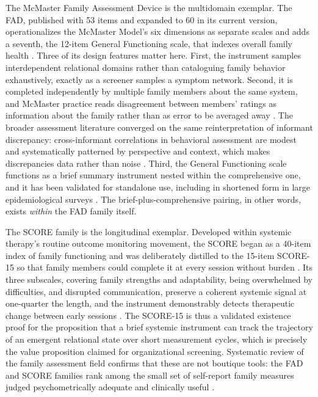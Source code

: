\documentclass[12pt, letterpaper]{article}
\begin{document}
The McMaster Family Assessment Device is the multidomain exemplar. The FAD, published with 53 items and expanded to 60 in its current version, operationalizes the McMaster Model's six dimensions as separate scales and adds a seventh, the 12-item General Functioning scale, that indexes overall family health \parencite{epstein1983,miller2000}. Three of its design features matter here. First, the instrument samples interdependent relational domains rather than cataloguing family behavior exhaustively, exactly as a screener samples a symptom network. Second, it is completed independently by multiple family members about the same system, and McMaster practice reads disagreement between members' ratings as information about the family rather than as error to be averaged away \parencite{miller2000}. The broader assessment literature converged on the same reinterpretation of informant discrepancy: cross-informant correlations in behavioral assessment are modest and systematically patterned by perspective and context, which makes discrepancies data rather than noise \parencite{achenbach1987,delosreyes2005}. Third, the General Functioning scale functions as a brief summary instrument nested within the comprehensive one, and it has been validated for standalone use, including in shortened form in large epidemiological surveys \parencite{boterhovendehaan2015}. The brief-plus-comprehensive pairing, in other words, exists \emph{within} the FAD family itself.

The SCORE family is the longitudinal exemplar. Developed within systemic therapy's routine outcome monitoring movement, the SCORE began as a 40-item index of family functioning and was deliberately distilled to the 15-item SCORE-15 so that family members could complete it at every session without burden \parencite{stratton2010}. Its three subscales, covering family strengths and adaptability, being overwhelmed by difficulties, and disrupted communication, preserve a coherent systemic signal at one-quarter the length, and the instrument demonstrably detects therapeutic change between early sessions \parencite{stratton2014}. The SCORE-15 is thus a validated existence proof for the proposition that a brief systemic instrument can track the trajectory of an emergent relational state over short measurement cycles, which is precisely the value proposition claimed for organizational screening. Systematic review of the family assessment field confirms that these are not boutique tools: the FAD and SCORE families rank among the small set of self-report family measures judged psychometrically adequate and clinically useful \parencite{hamilton2016}.
\end{document}
